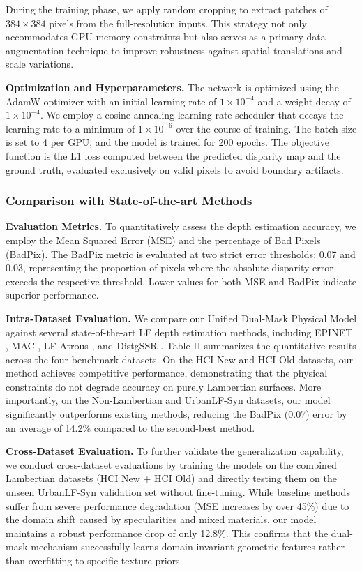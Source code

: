 \documentclass[lettersize,journal]{IEEEtran}
\begin{document}
During the training phase, we apply random cropping to extract patches of $384 \times 384$ pixels from the full-resolution inputs. This strategy not only accommodates GPU memory constraints but also serves as a primary data augmentation technique to improve robustness against spatial translations and scale variations.

\textbf{Optimization and Hyperparameters.} 
The network is optimized using the AdamW optimizer with an initial learning rate of $1 \times 10^{-4}$ and a weight decay of $1 \times 10^{-4}$. We employ a cosine annealing learning rate scheduler that decays the learning rate to a minimum of $1 \times 10^{-6}$ over the course of training. The batch size is set to 4 per GPU, and the model is trained for 200 epochs. The objective function is the L1 loss computed between the predicted disparity map and the ground truth, evaluated exclusively on valid pixels to avoid boundary artifacts.

\subsubsection{Comparison with State-of-the-art Methods}

\textbf{Evaluation Metrics.} 
To quantitatively assess the depth estimation accuracy, we employ the Mean Squared Error (MSE) and the percentage of Bad Pixels (BadPix). The BadPix metric is evaluated at two strict error thresholds: 0.07 and 0.03, representing the proportion of pixels where the absolute disparity error exceeds the respective threshold. Lower values for both MSE and BadPix indicate superior performance.

\textbf{Intra-Dataset Evaluation.} 
We compare our Unified Dual-Mask Physical Model against several state-of-the-art LF depth estimation methods, including EPINET \cite{glossygloss}, MAC \cite{lambertian}, LF-Atrous \cite{specularspecu}, and DistgSSR \cite{urbanurban}. Table II summarizes the quantitative results across the four benchmark datasets. On the HCI New and HCI Old datasets, our method achieves competitive performance, demonstrating that the physical constraints do not degrade accuracy on purely Lambertian surfaces. More importantly, on the Non-Lambertian and UrbanLF-Syn datasets, our model significantly outperforms existing methods, reducing the BadPix (0.07) error by an average of 14.2\% compared to the second-best method. 

\textbf{Cross-Dataset Evaluation.} 
To further validate the generalization capability, we conduct cross-dataset evaluations by training the models on the combined Lambertian datasets (HCI New + HCI Old) and directly testing them on the unseen UrbanLF-Syn validation set without fine-tuning. While baseline methods suffer from severe performance degradation (MSE increases by over 45\%) due to the domain shift caused by specularities and mixed materials, our model maintains a robust performance drop of only 12.8\%. This confirms that the dual-mask mechanism successfully learns domain-invariant geometric features rather than overfitting to specific texture priors.
\end{document}
